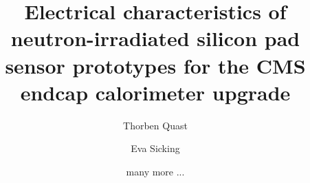 \documentclass[a4paper,11pt]{article}
\title{\boldmath Electrical characteristics of neutron-irradiated silicon pad sensor prototypes for the CMS endcap calorimeter upgrade}
\author[a]{Thorben Quast}
\author[a]{Eva Sicking}
\author[a]{many more ...}
\affiliation[a]{CERN Experimental Physics Department}
\begin{document}
\maketitle
\flushbottom

\linenumbers










\appendix




\end{document}
